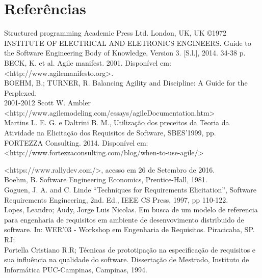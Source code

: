 
\chapter[Referências]{Referências}

Structured programming  Academic Press Ltd. London, UK, UK ©1972\\

INSTITUTE OF ELECTRICAL AND ELETRONICS ENGINEERS. Guide to the Software Engineering Body of Knowledge, Version 3. [S.l.], 2014. 34-38 p.\\

BECK, K. et al. Agile manifest. 2001. Disponível em: \\<http://www.agilemanifesto.org>.\\

BOEHM, B.; TURNER, R. Balancing Agility and Discipline: A Guide for the Perplexed.\\

2001-2012 Scott W. Ambler \\<http://www.agilemodeling.com/essays/agileDocumentation.htm>\\

Martins L. E. G. e Daltrini B. M., Utilização dos preceitos da Teoria da Atividade na Elicitação dos Requisitos de Software, SBES’1999, pp.\\

FORTEZZA Consulting. 2014. Disponível em: <http://www.fortezzaconsulting.com/blog/when-to-use-agile/>

<https://www.rallydev.com/>, acesso em 26 de Setembro de 2016.\\
Boehm, B. Software Engineering Economics, Prentice-Hall, 1981.\\

Goguen, J. A. and C. Linde “Techniques for Requirements Elicitation”, Software Requirements Engineering, 2nd. Ed., IEEE CS Press, 1997, pp 110-122.\\

Lopes,  Leandro;  Audy,  Jorge  Luis  Nicolas.  Em  busca  de  um  modelo  de  referencia  para 
engenharia  de  requisitos  em  ambiente  de  desenvovimento  distribuido  de  software.  In: 
WER'03 - Workshop em Engenharia de Requisitos. Piracicaba, SP. RJ:\\

Portella Cristiano R.R; Técnicas de prototipação na especificação de requisitos e sua influência na qualidade do software. Dissertação de Mestrado, Instituto de Informática PUC-Campinas, Campinas, 1994.\\

